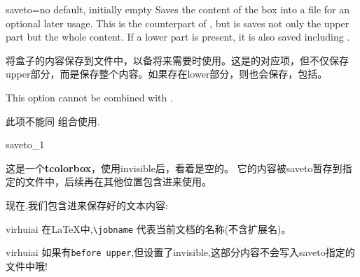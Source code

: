 \begin{docTcbKey}[][doc new=2015-05-04]{saveto}{=}{no default, initially empty}
Saves the content of the box into a file for an optional later usage.
This is the counterpart of , but is saves not
only the upper part but the whole content. If a lower part is present,
it is also saved including .


将盒子的内容保存到文件中，以备将来需要时使用。这是的对应项，但不仅保存upper部分，而是保存整个内容。如果存在lower部分，则也会保存，包括。

\begin{marker}
This option cannot be combined with .

此项不能同  组合使用.
\end{marker}

\begin{exdispExample}{saveto_1}
\begin{tcolorbox}[invisible%
,saveto=\jobname_mysave1.tex
,colback=white
,before upper={before upper}]
这是一个\textbf{tcolorbox}，使用invisible后，看着是空的。
它的内容被saveto暂存到指定的文件中，后续再在其他位置包含进来使用。
\end{tcolorbox}

现在,我们包含进来保存好的文本内容:\\



\end{exdispExample}


\begin{引述之言}{virhuiai}
在LaTeX中,\verb|\jobname| 代表当前文档的名称(不含扩展名)。
\end{引述之言}

\begin{引述之言}{virhuiai}
如果有\verb|before upper|,但设置了invisible,这部分内容不会写入saveto指定的文件中哦!
\end{引述之言}



\end{docTcbKey}
